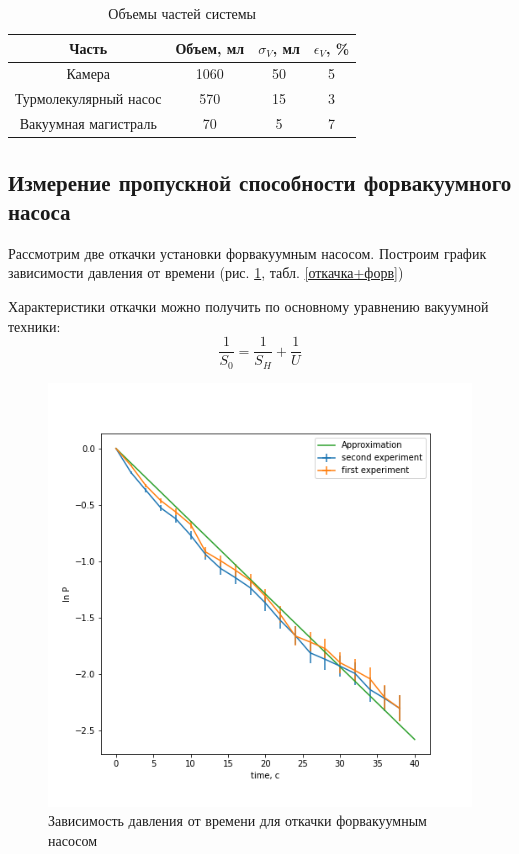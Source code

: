 \documentclass[a4paper,12pt]{article} %
\begin{document}
\begin{table}
\caption{Объемы частей системы}
\label{объемы}
\begin{tabular}{|c|c|c|c|}
\hline 
Часть & Объем, мл & $\sigma_V$, мл &$ \epsilon_V$, \% \\ 
\hline 
Камера & 1060 & 50 & 5 \\ 
\hline 
Турмолекулярный насос& 570 & 15 & 3\\ 
\hline 
Вакуумная магистраль & 70 & 5 & 7\\ 
\hline  
\end{tabular} 
\end{table}
\subsection{Измерение пропускной способности форвакуумного насоса}
Рассмотрим две откачки установки форвакуумным насосом. Построим график зависимости давления от времени (рис. \ref{форвакуумный}, табл. \ref{откачка+форв})

Характеристики откачки можно получить по основному уравнению вакуумной техники:
\begin{equation}
\frac{1}{S_0} = \frac{1}{S_H}+\frac{1}{U} 
\end{equation}

\begin{figure}[h!]
\begin{center}
\includegraphics[width=\textwidth]{Форвакуумный}
\end{center}
\caption{Зависимость давления от времени для откачки форвакуумным насосом} \label{форвакуумный}
\end{figure}
\end{document}
